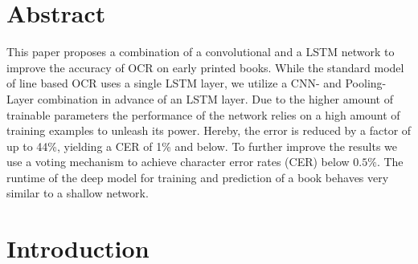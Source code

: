 \documentclass{jlcl}
\title{\articletitle}
\author{Christoph Wick\\
University of Würzburg\\
\texttt{christoph.wick@uni-wuerzburg.de} \and
Christian Reul\\
University of Würzburg\\
\texttt{christian.reul@uni-wuerzburg.de} \and
Frank Puppe\\
University of Würzburg\\
\texttt{frank.puppe@uni-wuerzburg.de}
}
\begin{document}
\setcounter{page}{1}
\thispagestyle{firstpage}

\authordata


\section*{Abstract}

This paper proposes a combination of a convolutional and a LSTM network to improve the accuracy of OCR on early printed books.
While the standard model of line based OCR uses a single LSTM layer, we utilize a CNN- and Pooling-Layer combination in advance of an LSTM layer.
Due to the higher amount of trainable parameters the performance of the network relies on a high amount of training examples to unleash its power.
Hereby, the error is reduced by a factor of up to 44\%, yielding a CER of 1\% and below.
To further improve the results we use a voting mechanism to achieve character error rates (CER) below $0.5\%$.
The runtime of the deep model for training and prediction of a book behaves very similar to a shallow network.

\section{Introduction}
\end{document}
